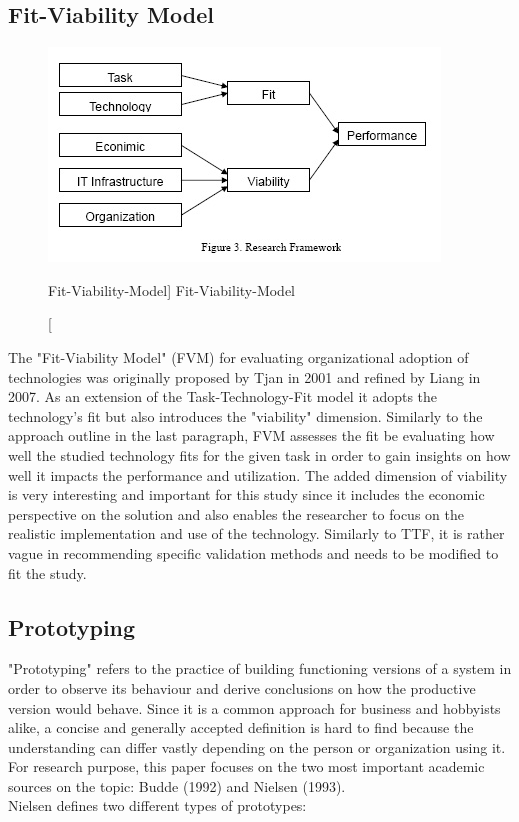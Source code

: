     \subsection{Fit-Viability Model}
    \begin{figure}[ht]
        \includegraphics[width=0.7\linewidth]{images/methodology/fvm.jpg}\centering
        \caption
        [Fit-Viability-Model]
        {Fit-Viability-Model \cite{Liang2007AdoptionModel}}
    \end{figure}
    The "Fit-Viability Model" (FVM) for evaluating organizational adoption of technologies was originally proposed by Tjan in 2001 and refined by Liang in 2007. As an extension of the Task-Technology-Fit model it adopts the technology's fit but also introduces the "viability" dimension. Similarly to the approach outline in the last paragraph, FVM assesses the fit be evaluating how well the studied technology fits for the given task in order to gain insights on how well it impacts the performance and utilization. The added dimension of viability is very interesting and important for this study since it includes the economic perspective on the solution and also enables the researcher to focus on the realistic implementation and use of the technology. Similarly to TTF, it is rather vague in recommending specific validation methods and needs to be modified to fit the study. 
    
    \subsection{Prototyping}
    "Prototyping" refers to the practice of building functioning versions of a system in order to observe its behaviour and derive conclusions on how the productive version would behave.\autocite{Budde1992Prototyping} Since it is a common approach for business and hobbyists alike, a concise and generally accepted definition is hard to find because the understanding can differ vastly depending on the person or organization using it. For research purpose, this paper focuses on the two most important academic sources on the topic: Budde (1992) and Nielsen (1993).\\
    Nielsen defines two different types of prototypes:
    
